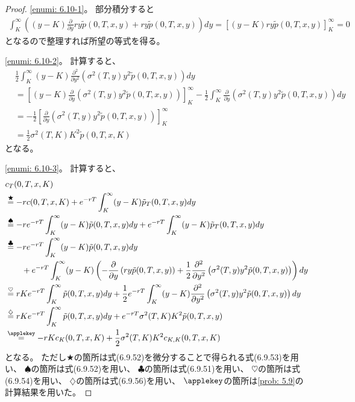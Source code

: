 \documentclass[uplatex]{jsarticle}
\theoremstyle{definition}
\begin{document}
\begin{proof}
  \ref{enumi: 6.10-1}。
  部分積分すると
  \begin{align*}
    \int_K^\infty \left(
    (y-K)\frac{\partial}{\partial y}ry\tilde{p}(0,T,x,y)
    + ry\tilde{p}(0,T,x,y)\right) dy
    = \left[ (y-K)ry\tilde{p}(0,T,x,y)\right]_K^\infty = 0
  \end{align*}
  となるので整理すれば所望の等式を得る。

  \ref{enumi: 6.10-2}。
  計算すると、
  \begin{align*}
    &\frac{1}{2}\int_K^{\infty}(y-K)\frac{\partial^2}{\partial y^2}
    \left( \sigma^2(T,y)y^2\tilde{p}(0,T,x,y)\right) dy \\
    &= \left[ (y-K)\frac{\partial}{\partial y}
    \left( \sigma^2(T,y)y^2\tilde{p}(0,T,x,y)\right)
    \right]_K^{\infty}
    - \frac{1}{2}\int_K^{\infty}
    \frac{\partial}{\partial y}
    \left( \sigma^2(T,y)y^2\tilde{p}(0,T,x,y)\right) dy \\
    &= - \frac{1}{2}\left[ \frac{\partial}{\partial y}
    \left( \sigma^2(T,y)y^2\tilde{p}(0,T,x,y)\right) \right]_K^\infty \\
    &= \frac{1}{2}\sigma^2(T,K)K^2\tilde{p}(0,T,x,K)
  \end{align*}
  となる。

  \ref{enumi: 6.10-3}。
  計算すると、
  \begin{align*}
    &c_T(0,T,x,K) \\
    &\overset{\bigstar}{=}
    -rc(0,T,x,K) + e^{-rT}\int_K^{\infty}(y-K)\tilde{p}_T(0,T,x,y)dy \\
    &\overset{\spadesuit}{=}
    -re^{-rT}\int_K^\infty (y-K)\tilde{p}(0,T,x,y)dy
    + e^{-rT}\int_K^\infty (y-K)\tilde{p}_T(0,T,x,y)dy \\
    &\overset{\clubsuit}{=}
    -re^{-rT}\int_K^\infty (y-K)\tilde{p}(0,T,x,y)dy \\
    &\ \ \ \ \ \
    + e^{-rT}\int_K^\infty (y-K)
    \left( -\frac{\partial}{\partial y}\left( ry\tilde{p}(0,T,x,y) \right)
    + \frac{1}{2}\frac{\partial^2}{\partial y^2}
    \left( \sigma^2(T,y)y^2\tilde{p}(0,T,x,y) \right)
    \right)dy \\
    &\overset{\heartsuit}{=}
    rK e^{-rT}\int_K^\infty\tilde{p}(0,T,x,y)dy
    + \frac{1}{2}e^{-rT}\int_K^\infty (y-K)\frac{\partial^2}{\partial y^2}
    \left( \sigma^2(T,y)y^2\tilde{p}(0,T,x,y) \right) dy \\
    &\overset{\diamondsuit}{=}
    rK e^{-rT}\int_K^\infty\tilde{p}(0,T,x,y)dy
    + e^{-rT}\sigma^2(T,K)K^2\tilde{p}(0,T,x,y) \\
    &\overset{\applekey}{=}
    - rK c_K(0,T,x,K) + \frac{1}{2}\sigma^2(T,K)K^2c_{K,K}(0,T,x,K)
  \end{align*}
  となる。
  ただし\(\bigstar\)の箇所は式(6.9.52)を微分することで得られる式(6.9.53)を用い、
  \(\spadesuit\)の箇所は式(6.9.52)を用い、
  \(\clubsuit\)の箇所は式(6.9.51)を用い、
  \(\heartsuit\)の箇所は式(6.9.54)を用い、
  \(\diamondsuit\)の箇所は式(6.9.56)を用い、
  \(\applekey\)の箇所は\autoref{prob: 5.9}の計算結果を用いた。
\end{proof}
\end{document}
